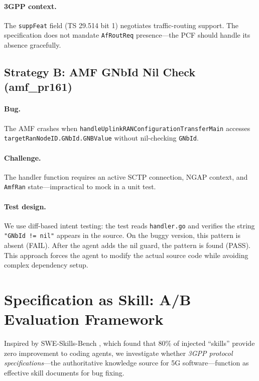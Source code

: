 \documentclass{article}
\begin{document}
\paragraph{3GPP context.} The \texttt{suppFeat} field (TS 29.514 bit 1) negotiates traffic-routing support. The specification does not mandate \texttt{AfRoutReq} presence---the PCF should handle its absence gracefully.

\subsection{Strategy B: AMF GNbId Nil Check (amf\_pr161)}

\paragraph{Bug.} The AMF crashes when \texttt{handleUplinkRANConfigurationTransferMain} accesses \texttt{targetRanNodeID.GNbId.GNBValue} without nil-checking \texttt{GNbId}.

\paragraph{Challenge.} The handler function requires an active SCTP connection, NGAP context, and \texttt{AmfRan} state---impractical to mock in a unit test.

\paragraph{Test design.} We use diff-based intent testing: the test reads \texttt{handler.go} and verifies the string \texttt{"GNbId != nil"} appears in the source. On the buggy version, this pattern is absent (FAIL). After the agent adds the nil guard, the pattern is found (PASS). This approach forces the agent to modify the actual source code while avoiding complex dependency setup.

\section{Specification as Skill: A/B Evaluation Framework}

Inspired by SWE-Skills-Bench \citep{han2025sweskills}, which found that 80\% of injected ``skills'' provide zero improvement to coding agents, we investigate whether \emph{3GPP protocol specifications}---the authoritative knowledge source for 5G software---function as effective skill documents for bug fixing.
\end{document}
